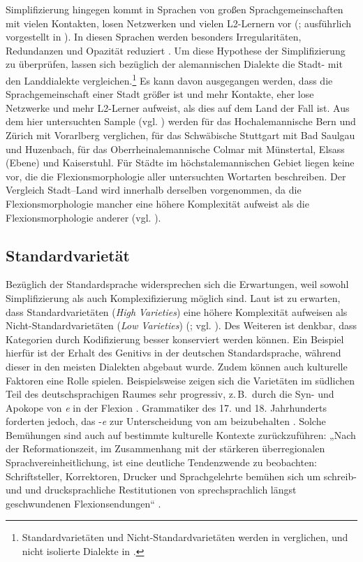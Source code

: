 Simplifizierung hingegen kommt in Sprachen von großen Sprachgemeinschaften mit vielen Kontakten, losen Netzwerken und vielen L2-Ler\-nern vor (\citealt[146]{Trudgill2011}; ausführlich vorgestellt in ). In diesen Sprachen werden besonders Irregularitäten, Redundanzen und Opazität reduziert \citep[101]{Trudgill2009}. Um diese Hypothese der Simplifizierung zu überprüfen, lassen sich bezüglich der alemannischen Dialekte die Stadt- mit den Landdialekte vergleichen.\footnote{Standardvarietäten und Nicht-Stan\-dard\-va\-ri\-e\-tä\-ten werden in  verglichen,  und nicht isolierte Dialekte in .} Es kann davon ausgegangen werden, dass die Sprachgemeinschaft einer Stadt größer ist und mehr Kontakte, eher lose Netzwerke und mehr L2-Ler\-ner aufweist, als dies auf dem Land der Fall ist. Aus dem hier untersuchten Sample (vgl. ) werden für das Hochalemannische Bern und Zürich mit Vorarlberg verglichen, für das Schwäbische Stuttgart mit Bad Saulgau und Huzenbach, für das Oberrheinalemannische Colmar mit Münstertal, Elsass (Ebene) und Kaiserstuhl. Für Städte im höchstalemannischen Gebiet liegen keine  vor, die die Flexionsmorphologie aller untersuchten Wortarten beschreiben. Der Vergleich Stadt–Land wird innerhalb derselben  vorgenommen, da die Flexionsmorphologie mancher  eine höhere Komplexität aufweist als die Flexionsmorphologie anderer  (vgl. ).

\subsection{Standardvarietät}\label{3.2.4}

Bezüglich der Standardsprache widersprechen sich die Erwartungen, weil sowohl Simplifizierung als auch Komplexifizierung möglich sind. Laut \citet{Ferguson1959} ist zu erwarten, dass Standardvarietäten (\textit{High} \textit{Varieties}) eine höhere Komplexität aufweisen als Nicht-Stan\-dard\-va\-ri\-e\-tä\-ten (\textit{Low} \textit{Varieties}) (\citealt[333]{Ferguson1959}; vgl. ). Des Weiteren ist denkbar, dass Kategorien durch Kodifizierung besser konserviert werden können. Ein Beispiel hierfür ist der Erhalt des Genitivs in der deutschen Standardsprache, während dieser in den meisten Dialekten abgebaut wurde. Zudem können auch kulturelle Faktoren eine Rolle spielen. Beispielsweise zeigen sich die Varietäten im südlichen Teil des deutschsprachigen Raumes sehr progressiv, z.\,B.\ durch die Syn- und Apokope von \textit{e} in der Flexion \citep[275]{vonPolenz2013}. Grammatiker des 17. und 18. Jahrhunderts forderten jedoch, das -\textit{e} zur Unterscheidung von  am  beizubehalten \citep[275]{vonPolenz2013}. Solche Bemühungen sind auch auf bestimmte kulturelle Kontexte zurückzuführen: „Nach der Reformationszeit, im Zusammenhang mit der stärkeren überregionalen Sprachvereinheitlichung, ist eine deutliche Tendenzwende zu beobachten: Schriftsteller, Korrektoren, Drucker und Sprachgelehrte bemühen sich um schreib- und und drucksprachliche Restitutionen von sprechsprachlich längst geschwundenen Flexionsendungen“ \citep[275]{vonPolenz2013}.

